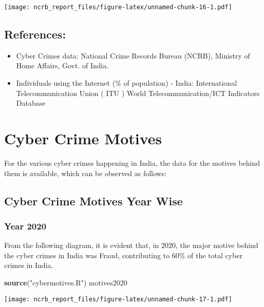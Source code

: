 \documentclass[
  12,
  a4paper,
]{report}
\newenvironment{Shaded}{\begin{snugshade}}{\end{snugshade}}
\newcommand{\FunctionTok}[1]{\textcolor[rgb]{0.13,0.29,0.53}{\textbf{#1}}}
\newcommand{\NormalTok}[1]{#1}
\newcommand{\StringTok}[1]{\textcolor[rgb]{0.31,0.60,0.02}{#1}}
\providecommand{\tightlist}{%
  \setlength{\itemsep}{0pt}\setlength{\parskip}{0pt}}
\begin{document}
\texttt{[image: ncrb\_report\_files/figure-latex/unnamed-chunk-16-1.pdf]}

\hypertarget{references}{%
\section{References:}\label{references}}

\begin{itemize}
\tightlist
\item
  Cyber Crimes data: National Crime Records Bureau (NCRB), Ministry of
  Home Affairs, Govt. of India.\\
\item
  Individuals using the Internet (\% of population) - India:
  International Telecommunication Union ( ITU ) World
  Telecommunication/ICT Indicators Database
\end{itemize}

\hypertarget{cyber-crime-motives}{%
\chapter{Cyber Crime Motives}\label{cyber-crime-motives}}

For the various cyber crimes happening in India, the data for the
motives behind them is available, which can be observed as follows:

\hypertarget{cyber-crime-motives-year-wise}{%
\section{Cyber Crime Motives Year
Wise}\label{cyber-crime-motives-year-wise}}

\hypertarget{year-2020-1}{%
\subsection{Year 2020}\label{year-2020-1}}

From the following diagram, it is evident that, in 2020, the major
motive behind the cyber crimes in India was Fraud, contributing to 60\%
of the total cyber crimes in India.

\begin{Shaded}
\begin{Highlighting}[]
\FunctionTok{source}\NormalTok{(}\StringTok{"cybermotives.R"}\NormalTok{)}
\NormalTok{motives2020}
\end{Highlighting}
\end{Shaded}

\texttt{[image: ncrb\_report\_files/figure-latex/unnamed-chunk-17-1.pdf]}
\end{document}
